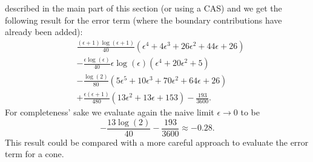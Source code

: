 described in the main part of this section (or using a CAS) and we get the
following result for the error term (where the boundary contributions have
already been added):
\begin{align}
  &\frac{(\epsilon + 1)\log(\epsilon + 1)}{40}
  (\epsilon^4 + 4\epsilon^3 + 26\epsilon^2 + 44\epsilon + 26) \\
  &-
  \frac{\epsilon\log(\epsilon)}{40}
    \epsilon\log(\epsilon)(\epsilon^4 + 20\epsilon^2 + 5) \\
    &-
  \frac{\log(2)}{80}(5\epsilon^5 + 10\epsilon^3 + 70\epsilon^2 + 64\epsilon+26)
  \\
  &+ \frac{\epsilon(\epsilon+1)}{480}(13\epsilon^2 + 13\epsilon + 153)
  -\frac{193}{3600}.
\end{align}
For completeness' sake we evaluate again the naive limit $\epsilon\to0$ to be
\begin{equation}
  -\frac{13\log(2)}{40}-\frac{193}{3600} \approx -0.28.
\end{equation}
This result could be compared with a more careful approach to evaluate the error
term for a cone.
